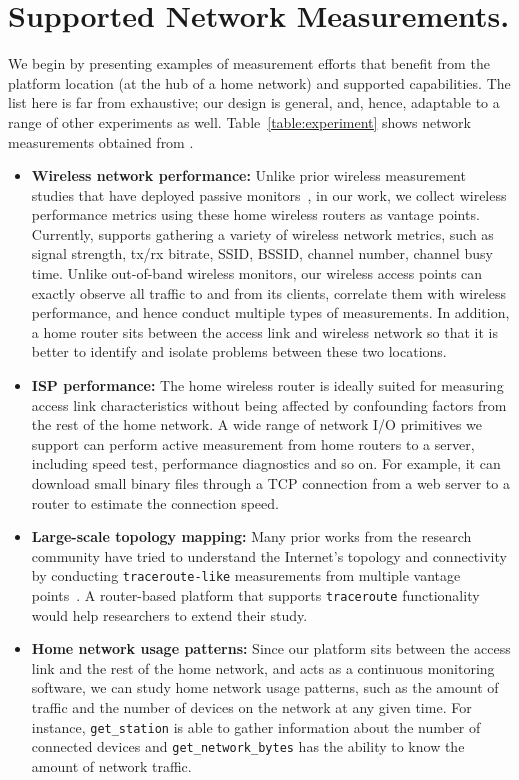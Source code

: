 {\section{Supported Network Measurements.}
\label{sec.network_measurement}
We begin by presenting examples of measurement efforts that benefit from the platform location (at the hub of a home network) and supported capabilities. The list here is far from exhaustive; our design is general, and, hence, adaptable to a range of other experiments as well. Table~\ref{table:experiment} shows network measurements obtained from \sysname.

\begin{itemize}
\item \textbf{Wireless network performance:} Unlike prior wireless measurement studies that have deployed passive monitors~\cite{mahajan2006analyzing,raghavendra2009wi,papagiannaki2006experimental}, in our work, we collect wireless performance metrics using these home wireless routers as vantage points. Currently, \sysname supports gathering a variety of wireless network metrics, such as signal strength, tx/rx bitrate, SSID, BSSID, channel number, channel busy time. Unlike out-of-band wireless monitors, our wireless access points can exactly observe all traffic to and from its clients, correlate them with wireless performance, and hence conduct multiple types of measurements. In addition, a home router sits between the access link and wireless network so that it is better to identify and isolate problems between these two locations.

\item \textbf{ISP performance:} The home wireless router is ideally suited for measuring access link characteristics without being affected by confounding factors from the rest of the home network. A wide range of network I/O primitives we support can perform active measurement from home routers to a server, including speed test, performance diagnostics and so on. For example, it can download small binary files through a TCP connection from a web server to a router to estimate the connection speed.

\item \textbf{Large-scale topology mapping:} Many prior works from the research community have tried to understand the Internet's topology and connectivity by conducting \texttt{traceroute-like} measurements from multiple vantage points~\cite{paxson1996end,chen2009sidewalk}. A router-based platform that supports \texttt{traceroute} functionality would help researchers to extend their study.

\item \textbf{Home network usage patterns:} Since our platform sits between the access link and the rest of the home network, and acts as a continuous monitoring software, we can study home network usage patterns, such as the amount of traffic and the number of devices on the network at any given time. For instance, \texttt{get\_station} is able to gather information about the number of connected devices and \texttt{get\_network\_bytes} has the ability to know the amount of network traffic.    
\end{itemize} 
\par}
